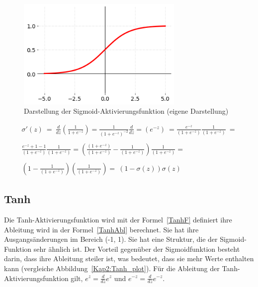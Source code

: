 \begin{figure}[H]
    \centering
    \includegraphics[width=8cm]{kapitel2/sig_plot.png}
    \caption[Darstellung der Sigmoid-Aktivierungsfunktion]{Darstellung der Sigmoid-Aktivierungsfunktion (eigene Darstellung)}
    \label{Kap2:Sigmoid_plot}
\end{figure}


\begin{equation} \label{AbleitungSigm}
    \begin{array}{ c }
        \sigma '(z)\ =\ \frac{d}{dz}\left(\frac{1}{1+e^{-z}}\right) =\frac{1}{\left( 1+e^{-z}\right)^{-2}}\frac{d}{dz} =\left( e^{-z}\right) \ =\frac{e^{-z}}{\left( 1+e^{-z}\right)}\frac{1}{\left( 1+e^{-z}\right)} \ =  \\
        \\
        \frac{e^{-z} +1-1}{\left( 1+e^{-z}\right)}\frac{1}{\left( 1+e^{-z}\right)} =\left(\frac{\left( 1+e^{-z}\right)}{\left( 1+e^{-z}\right)} -\frac{1}{\left( 1+e^{-z}\right)}\right)\frac{1}{\left( 1+e^{-z}\right)} = \\
        \\
        \left( 1-\frac{1}{\left( 1+e^{-z}\right)}\right)\left(\frac{1}{\left( 1+e^{-z}\right)}\right) =\ (1-\sigma (z))\sigma (z)
    \end{array}
\end{equation}
\label{AbleitungSigm}

\subsection{Tanh}
Die Tanh-Aktivierungsfunktion wird mit der Formel~\ref{TanhF} definiert ihre Ableitung wird in der Formel~\ref{TanhAbl} berechnet. Sie hat ihre Ausgangsänderungen im Bereich (-1, 1). Sie hat eine Struktur, die der Sigmoid-Funktion sehr ähnlich ist. Der Vorteil gegenüber der Sigmoidfunktion besteht darin, dass ihre Ableitung steiler ist, was bedeutet, dass sie mehr Werte enthalten kann (vergleiche Abbildung~\ref{Kap2:Tanh_plot}). Für die Ableitung der Tanh-Aktivierungsfunktion gilt, $e^z = \frac{d}{dz}e^z$ und $e^{-z} = \frac{d}{dz}e^{-z}$.

